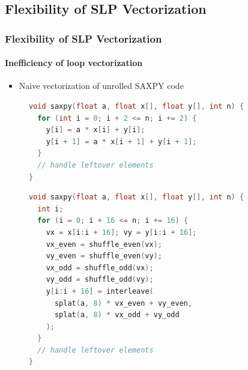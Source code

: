 \documentclass[aspectratio=169]{beamer}
\begin{document}
\subsection{Flexibility of SLP Vectorization}
\begin{frame}[fragile]
  \frametitle{Flexibility of SLP Vectorization}
  \framesubtitle{Inefficiency of loop vectorization}

  \begin{itemize}
    \item Naive vectorization of unrolled SAXPY code
  \end{itemize}
  \begin{figure}
    \centering
    \begin{minipage}{.45\textwidth}
      \begin{lstlisting}[language=C]
void saxpy(float a, float x[], float y[], int n) {
  for (int i = 0; i + 2 <= n; i += 2) {
    y[i] = a * x[i] + y[i];
    y[i + 1] = a * x[i + 1] + y[i + 1];
  }
  // handle leftover elements
}
      \end{lstlisting}
    \end{minipage}
    \hspace{0.2cm}
    \pause
    \begin{minipage}{.45\textwidth}
      \begin{lstlisting}[language=C]
void saxpy(float a, float x[], float y[], int n) {
  int i;
  for (i = 0; i + 16 <= n; i += 16) {
    vx = x[i:i + 16]; vy = y[i:i + 16];
    vx_even = shuffle_even(vx);
    vy_even = shuffle_even(vy);
    vx_odd = shuffle_odd(vx);
    vy_odd = shuffle_odd(vy);
    y[i:i + 16] = interleave(
      splat(a, 8) * vx_even + vy_even,
      splat(a, 8) * vx_odd + vy_odd
    );
  }
  // handle leftover elements
}
      \end{lstlisting}
    \end{minipage}
  \end{figure}
\end{frame}
\end{document}
